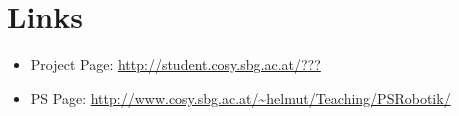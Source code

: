\documentclass[12pt,fleqn,a4paper]{article}
\begin{document}
\newpage

\section{Links}

\begin{itemize}
\item Project Page: \url{http://student.cosy.sbg.ac.at/???}
\item PS Page:
\url{http://www.cosy.sbg.ac.at/~helmut/Teaching/PSRobotik/}

\end{itemize}

\end{document}
